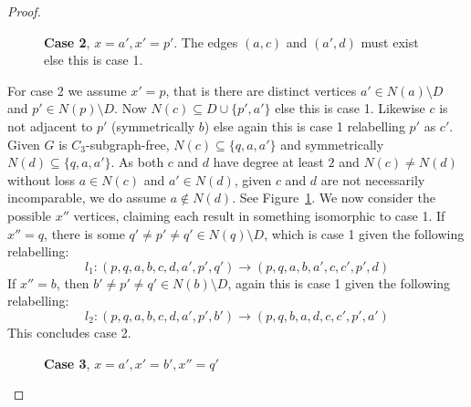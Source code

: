 \documentclass[a4paper,UKenglish,cleveref, autoref,thm-restate]{lipics-v2021}
\begin{document}
\begin{proof}
\begin{figure}
\caption{\textbf{Case 2}, $x=a',x'=p'$. The edges $(a,c)$ and $(a',d)$ must exist else this is case 1.}
\label{fig:case2}
\end{figure}

For case 2 we assume $x' = p$, that is there are distinct vertices $a' \in N(a) \setminus D$ and $p' \in N(p) \setminus D$. Now $N(c) \subseteq D \cup \{p',a'\}$ else this is case 1. Likewise $c$ is not adjacent to $p'$ (symmetrically $b$) else again this is case 1 relabelling $p'$ as $c'$. Given $G$ is $C_3$-subgraph-free, $N(c) \subseteq \{q,a,a'\}$ and symmetrically $N(d) \subseteq \{q,a,a'\}$. As both $c$ and $d$ have degree at least $2$ and $N(c) \neq N(d)$ without loss $a \in N(c)$ and $a' \in N(d)$, given $c$ and $d$ are not necessarily incomparable, we do assume $a \notin N(d)$. See Figure~\ref{fig:case2}. We now consider the possible $x''$ vertices, claiming each result in something isomorphic to case 1. If $x'' =q$, there is some $q' \neq p' \neq q' \in N(q) \setminus D$, which is case 1 given the following relabelling: $$l_1 : (p,q,a,b,c,d,a',p',q') \to (p,q,a,b,a',c,c',p',d)$$ If $x''=b$, then $b' \neq p' \neq q' \in N(b) \setminus D$, again this is case 1 given the following relabelling: $$l_2 : (p,q,a,b,c,d,a',p',b') \to (p,q,b,a,d,c,c',p',a')$$ This concludes case 2.

\begin{figure}
    \centering
    
    \caption{\textbf{Case 3}, $x=a',x'=b', x''=q'$}
    \label{fig:case3}
\end{figure}


\end{proof}
\end{document}
